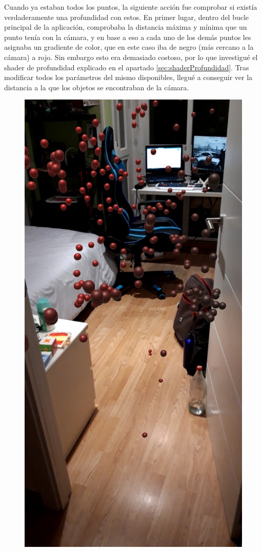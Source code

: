 Cuando ya estaban todos los puntos, la siguiente acción fue comprobar si existía verdaderamente una profundidad con estos.
En primer lugar, dentro del bucle principal de la aplicación, comprobaba la distancia máxima y mínima que un punto tenía con la cámara, y en base a eso a cada uno de los demás puntos les asignaba un gradiente de color, que en este caso iba de negro (más cercano a la cámara) a rojo. Sin embargo esto era demasiado costoso,
por lo que investigué el shader de profundidad explicado en el apartado \ref{sec:shaderProfundidad}. Tras modificar todos los parámetros del mismo disponibles, llegué a conseguir ver la distancia a la que los objetos se encontraban de la cámara.\\

\begin{figure}[H]
    \centering
    \includegraphics[scale=0.2]{Sections/Contribuciones/Imagenes/PuntosColores.jpg}

\end{figure}
